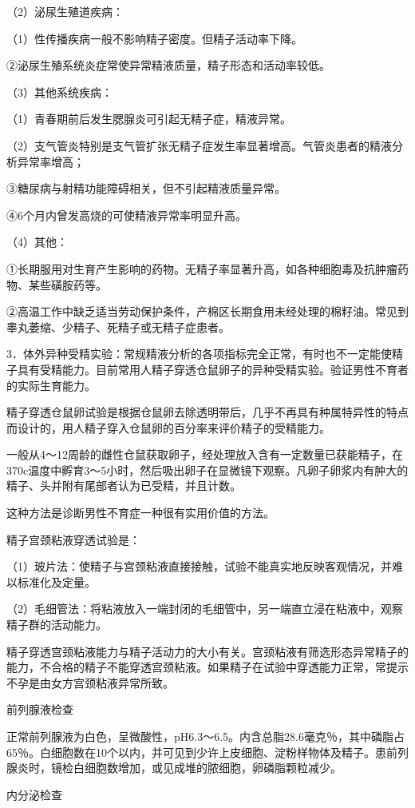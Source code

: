 \documentclass[12pt,UTF8,openany]{ctexbook}
\begin{document}
（2）泌尿生殖道疾病：

（1）性传播疾病一般不影响精子密度。但精子活动率下降。

②泌尿生殖系统炎症常使异常精液质量，精子形态和活动率较低。

（3）其他系统疾病：

（1）青春期前后发生腮腺炎可引起无精子症，精液异常。

（2）支气管炎特别是支气管扩张无精子症发生率显著增高。气管炎患者的精液分析异常率增高；

③糖尿病与射精功能障碍相关，但不引起精液质量异常。

④6个月内曾发高烧的可使精液异常率明显升高。

（4）其他：

①长期服用对生育产生影响的药物。无精子率显著升高，如各种细胞毒及抗肿瘤药物、某些磺胺药等。

②高温工作中缺乏适当劳动保护条件，产棉区长期食用未经处理的棉籽油。常见到睾丸萎缩、少精子、死精子或无精子症患者。

3．体外异种受精实验：常规精液分析的各项指标完全正常，有时也不一定能使精子具有受精能力。目前常用人精子穿透仓鼠卵子的异种受精实验。验证男性不育者的实际生育能力。

精子穿透仓鼠卵试验是根据仓鼠卵去除透明带后，几乎不再具有种属特异性的特点而设计的，用人精子穿入仓鼠卵的百分率来评价精子的受精能力。

一般从4～12周龄的雌性仓鼠获取卵子，经处理放入含有一定数量已获能精子，在370c温度中孵育3～5小时，然后吸出卵子在显微镜下观察。凡卵子卵浆内有肿大的精子、头并附有尾部者认为已受精，并且计数。

这种方法是诊断男性不育症一种很有实用价值的方法。

精子宫颈粘液穿透试验是：

（1）玻片法：使精子与宫颈粘液直接接触，试验不能真实地反映客观情况，并难以标准化及定量。

（2）毛细管法：将粘液放入一端封闭的毛细管中，另一端直立浸在粘液中，观察精子群的活动能力。

精子穿透宫颈粘液能力与精子活动力的大小有关。宫颈粘液有筛选形态异常精子的能力，不合格的精子不能穿透宫颈粘液。如果精子在试验中穿透能力正常，常提示不孕是由女方宫颈粘液异常所致。

前列腺液检查

正常前列腺液为白色，呈微酸性，pH6.3～6.5。内含总脂28.6毫克％，其中磷脂占65％。白细胞数在10个以内，并可见到少许上皮细胞、淀粉样物体及精子。患前列腺炎时，镜检白细胞数增加，或见成堆的脓细胞，卵磷脂颗粒减少。

内分泌检查
\end{document}
